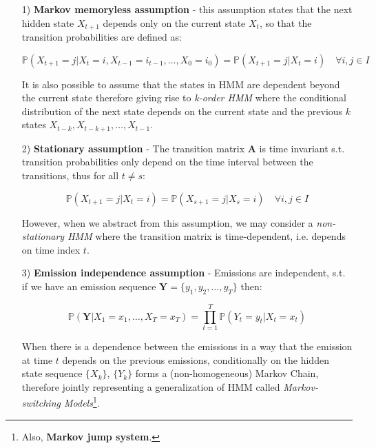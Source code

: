 \begin{itemize}
    \item[1)] \textbf{Markov memoryless assumption} - this assumption states that the next hidden state $X_{t+1}$ depends only on the current state $X_t$, so that the transition probabilities are defined as:

        \begin{equation}
            \mathbb{P}(X_{t+1} = j| X_{t} = i,X_{t-1} = i_{t-1}, \ldots,X_{0} = i_0) = \mathbb{P}(X_{t+1} = j| X_{t} = i) \quad \forall i,j \in I
        \end{equation}

        It is also possible to assume that the states in HMM are dependent beyond the current state therefore giving rise to \textit{k-order HMM} 
        where the conditional distribution of the next state depends on the current state and the previous $k$ states $X_{t-k}, X_{t-k+1}, \ldots, X_{t-1}$. \cite{Capp2005}

    \item[2)] \textbf{Stationary assumption} - The transition matrix $\textbf{A}$ is time invariant s.t. transition probabilities only depend on the time interval between the transitions, 
    thus for all $t \neq s$:

        \begin{equation}
            \mathbb{P}(X_{t+1} = j| X_{t}= i) = \mathbb{P}(X_{s+1} = j| X_s = i) \quad \forall i,j \in I
        \end{equation}

        However, when we abstract from this assumption, we may consider a \textit{non-stationary HMM} where the transition matrix is time-dependent, i.e. depends on time index $t$.

    \item[3)] \textbf{Emission independence assumption} - Emissions are independent, s.t. if we have an emission sequence $\textbf{Y} = \{y_1,y_2,\ldots,y_T\}$ then:

        \begin{equation}
            \mathbb{P}(\textbf{Y}|X_1 = x_1,\ldots,X_T = x_T) = \prod_{t=1}^T \mathbb{P}(Y_t = y_t|X_t = x_t)
        \end{equation}

        When there is a dependence between the emissions in a way that the emission at time $t$ depends on the previous emissions, conditionally on the hidden state sequence $\{X_k\}$, $\{Y_k\}$
        forms a (non-homogeneous) Markov Chain, therefore jointly representing a generalization of HMM called \textit{Markov-switching Models}\footnote{Also, \textbf{Markov jump system}.}. \cite{Capp2005}

\end{itemize}

